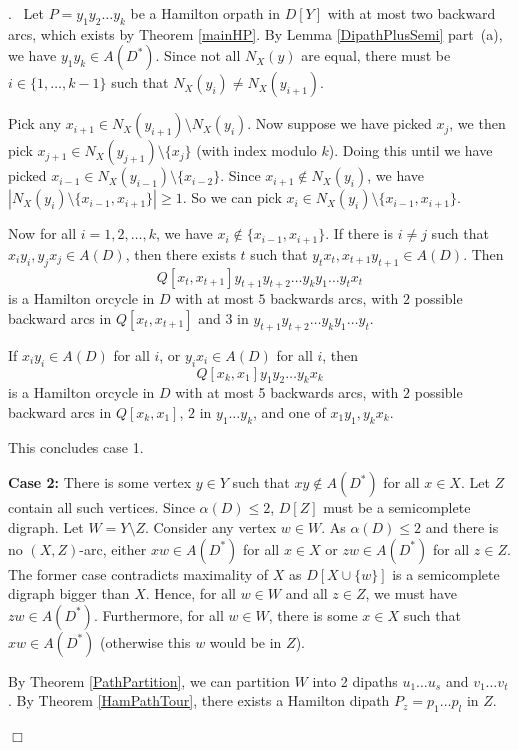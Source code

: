 \documentclass{article}
\newcommand{\2}{\vspace{2mm}}
\renewenvironment{proof}[1][]{\par \noindent {\bf Proof#1}.\ }{\hfill$\Box$
\par \vspace{11pt}}
\theoremstyle{definition}
\begin{document}
\begin{proof}
Let $P=y_1y_2\dots y_k$ be a Hamilton orpath in $D[Y]$ with at most two backward arcs, which exists by Theorem \ref{mainHP}. By Lemma \ref{DipathPlusSemi} part~(a), we have $y_1y_k \in A(D^*)$. Since not all $N_X(y)$ are equal, there must be $i \in \{1,\dots,k-1\}$ such that $N_X(y_i) \neq N_X(y_{i+1})$. 

Pick any $x_{i+1} \in N_X(y_{i+1}) \setminus N_X(y_i)$. Now suppose we have picked $x_j$, we then pick $x_{j+1} \in N_X(y_{j+1}) \setminus \{x_j\}$ (with index modulo $k$). Doing this until we have picked $x_{i-1} \in N_X(y_{i-1}) \setminus \{x_{i-2}\}$. Since $x_{i+1} \notin N_X(y_i)$, we have $|N_X(y_i)\setminus \{x_{i-1},x_{i+1}\}| \ge 1$. So we can pick $x_i \in N_X(y_i)\setminus \{x_{i-1},x_{i+1}\}$.

Now for all $i=1,2,\dots,k$, we have $x_i \notin \{x_{i-1},x_{i+1} \}$. If there is $i \neq j$ such that $x_iy_i, y_jx_j \in A(D)$, then there exists $t$ such that  $y_tx_t, x_{t+1}y_{t+1} \in A(D)$. Then 
\[
Q[x_t,x_{t+1}]y_{t+1}y_{t+2}\dots y_ky_1 \dots y_tx_t
\]
is a Hamilton orcycle in $D$ with at most $5$ backwards arcs, with $2$ possible backward arcs in $Q[x_t,x_{t+1}]$ and $3$ in $y_{t+1}y_{t+2}\dots y_ky_1 \dots y_t$.

If $x_iy_i\in A(D)$ for all $i$, or $y_ix_i\in A(D)$ for all $i$, then 
\[
Q[x_k,x_1]y_1y_2\dots y_kx_k
\]
is a Hamilton orcycle in $D$ with at most 5 backwards arcs, with $2$ possible backward arcs in  $Q[x_k,x_1]$, $2$ in $y_1\dots y_k$, and one of $x_1y_1,y_kx_k$.

This concludes case 1.

\2

\textbf{Case 2:} There is some vertex $y \in Y$ such that $xy \notin A(D^*)$ for all $x \in X$. Let $Z$ contain all such vertices. Since $\alpha(D) \le 2$, 
$D[Z]$ must be a semicomplete digraph.
Let $W=Y \setminus Z$. Consider any vertex $w \in W$. As $\alpha(D)\le 2$ and there is no $(X, Z)$-arc, either $xw \in A(D^*)$ for all $x \in X$ or $zw \in A(D^*)$ for all $z \in Z$. The former case contradicts maximality of $X$ as $D[X \cup \{w\}]$ is a semicomplete digraph bigger than $X$. Hence, for all $w \in W$ and all $z \in Z$, we must have $zw \in A(D^*)$. Furthermore, for all $w \in W$, there is some $x \in X$ such that $xw \in A(D^*)$ (otherwise this $w$ would be in $Z$).

By Theorem \ref{PathPartition}, we can partition $W$ into 2 dipaths $u_1 \dots u_s$ and $v_1 \dots v_t$. By Theorem \ref{HamPathTour}, there exists a Hamilton dipath $P_z=p_1 \dots p_l$ in $Z$.


\end{proof}
\end{document}
